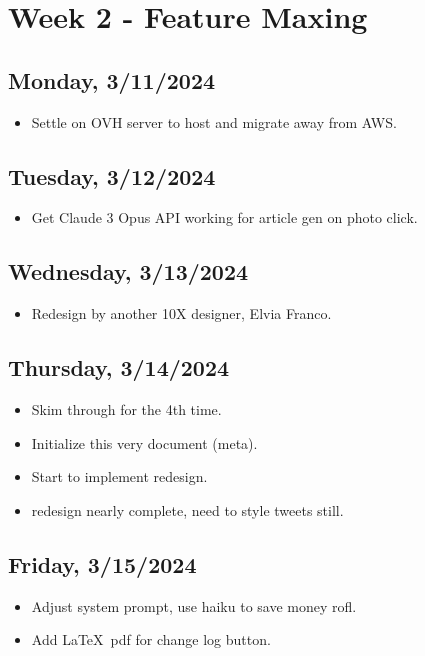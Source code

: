 \newpage
\section{Week 2 - Feature Maxing}

\subsection*{Monday, 3/11/2024}
\begin{itemize}
    \item Settle on OVH server to host and migrate away from AWS.
\end{itemize}

\subsection*{Tuesday, 3/12/2024}
\begin{itemize}
    \item Get Claude 3 Opus API working for article gen on photo click.
\end{itemize}

\subsection*{Wednesday, 3/13/2024}
\begin{itemize}
    \item Redesign by another 10X designer, Elvia Franco. 
\end{itemize}

\subsection*{Thursday, 3/14/2024}
\begin{itemize}
    \item Skim through \cite{huyen2022designing} for the 4th time.
    \item Initialize this very document (meta).
    \item Start to implement redesign.
    \item redesign nearly complete, need to style tweets still.
\end{itemize}

\subsection*{Friday, 3/15/2024}
\begin{itemize}
    \item Adjust system prompt, use haiku to save money rofl.
    \item Add \LaTeX\ pdf for change log button. 
\end{itemize}

